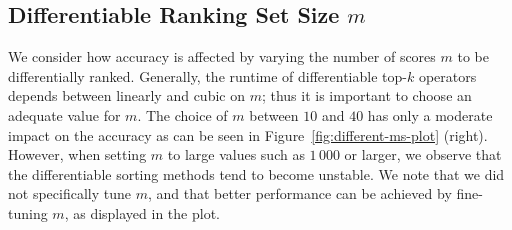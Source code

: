 \documentclass{article}
\begin{document}
\subsection{Differentiable Ranking Set Size $m$}
We consider how accuracy is affected by varying the number of scores $m$ to be differentially ranked. 
Generally, the runtime of differentiable top-$k$ operators depends between linearly and cubic on $m$; thus it is important to choose an adequate value for $m$.
The choice of $m$ between $10$ and $40$ has only a moderate impact on the accuracy as can be seen in Figure~\ref{fig:different-ms-plot} (right).
However, when setting $m$ to large values such as $1\,000$ or larger, we observe that the differentiable sorting methods tend to become unstable.
We note that we did not specifically tune $m$, and that better performance can be achieved by fine-tuning $m$, as displayed in the plot.



\begin{table}[t]
    \centering
    \addtolength{\tabcolsep}{-4pt}  
    \addtolength{\tabcolsep}{4pt}  
    \vspace*{-.5em}
    \caption{
        CIFAR-100 results for different distributions $P_K$ for training a ResNet18 from scratch.
        The metrics are Top-$1\,|\,$Top-$5$ accuracy averaged over 2 seeds.
    }
    \label{tab:cifar100-different-PK}
    \vspace*{-.25em}
\end{table}
\end{document}
